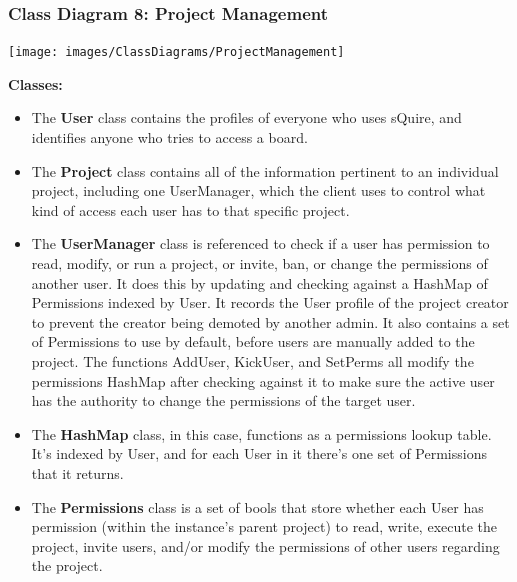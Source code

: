 \documentclass[twoside,letterpaper]{article}
\begin{document}
	\newpage
	
	\subsubsection[Class Diagram 8: Project Management]{\rmfamily\bfseries\color{black}
		Class Diagram 8: Project Management}
	\hypertarget{RefHeading22059017292}{}
	\bigskip
	
	\texttt{[image: images/ClassDiagrams/ProjectManagement]}
	
	\newpage
	
	\textbf{Classes:}
	\begin{itemize}
	
		\item The \textbf{User} class contains the profiles of everyone who uses sQuire, and identifies anyone who tries to access a board.
		\item The \textbf{Project} class contains all of the information pertinent to an individual project, including one UserManager, which the client uses to control what kind of access each user has to that specific project.
		\item The \textbf{UserManager} class is referenced to check if a user has permission to read, modify, or run a project, or invite, ban, or change the permissions of another user. It does this by updating and checking against a HashMap of Permissions indexed by User. It records the User profile of the project creator to prevent the creator being demoted by another admin. It also contains a set of Permissions to use by default, before users are manually added to the project.
		The functions AddUser, KickUser, and SetPerms all modify the permissions HashMap after checking against it to make sure the active user has the authority to change the permissions of the target user.
		\item The \textbf{HashMap} class, in this case, functions as a permissions lookup table. It's indexed by User, and for each User in it there's one set of Permissions that it returns.
		\item The \textbf{Permissions} class is a set of bools that store whether each User has permission (within the instance's parent project) to read, write, execute the project, invite users, and/or modify the permissions of other users regarding the project.
	\end{itemize}
	
	\newpage
\end{document}
